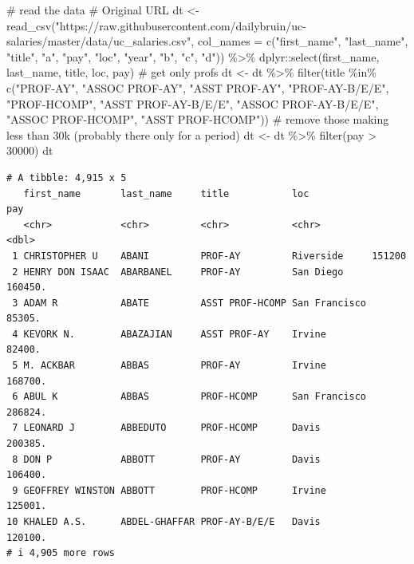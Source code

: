 \documentclass[
  letterpaper,
  DIV=11,
  numbers=noendperiod]{scrreprt}
\newenvironment{Shaded}{\begin{snugshade}}{\end{snugshade}}
\newcommand{\AttributeTok}[1]{\textcolor[rgb]{0.40,0.45,0.13}{#1}}
\newcommand{\CommentTok}[1]{\textcolor[rgb]{0.37,0.37,0.37}{#1}}
\newcommand{\DecValTok}[1]{\textcolor[rgb]{0.68,0.00,0.00}{#1}}
\newcommand{\FunctionTok}[1]{\textcolor[rgb]{0.28,0.35,0.67}{#1}}
\newcommand{\NormalTok}[1]{\textcolor[rgb]{0.00,0.23,0.31}{#1}}
\newcommand{\OtherTok}[1]{\textcolor[rgb]{0.00,0.23,0.31}{#1}}
\newcommand{\SpecialCharTok}[1]{\textcolor[rgb]{0.37,0.37,0.37}{#1}}
\newcommand{\StringTok}[1]{\textcolor[rgb]{0.13,0.47,0.30}{#1}}
\begin{document}
\begin{Shaded}
\begin{Highlighting}[]
\CommentTok{\# read the data}
\CommentTok{\# Original URL}
\NormalTok{dt }\OtherTok{\textless{}{-}} \FunctionTok{read\_csv}\NormalTok{(}\StringTok{"https://raw.githubusercontent.com/dailybruin/uc{-}salaries/master/data/uc\_salaries.csv"}\NormalTok{, }
               \AttributeTok{col\_names =} \FunctionTok{c}\NormalTok{(}\StringTok{"first\_name"}\NormalTok{, }\StringTok{"last\_name"}\NormalTok{, }\StringTok{"title"}\NormalTok{, }\StringTok{"a"}\NormalTok{, }\StringTok{"pay"}\NormalTok{, }\StringTok{"loc"}\NormalTok{, }\StringTok{"year"}\NormalTok{, }\StringTok{"b"}\NormalTok{, }\StringTok{"c"}\NormalTok{, }\StringTok{"d"}\NormalTok{)) }\SpecialCharTok{\%\textgreater{}\%} 
\NormalTok{      dplyr}\SpecialCharTok{::}\FunctionTok{select}\NormalTok{(first\_name, last\_name, title, loc, pay)}
\CommentTok{\# get only profs}
\NormalTok{dt }\OtherTok{\textless{}{-}}\NormalTok{ dt }\SpecialCharTok{\%\textgreater{}\%} \FunctionTok{filter}\NormalTok{(title }\SpecialCharTok{\%in\%} \FunctionTok{c}\NormalTok{(}\StringTok{"PROF{-}AY"}\NormalTok{, }\StringTok{"ASSOC PROF{-}AY"}\NormalTok{, }\StringTok{"ASST PROF{-}AY"}\NormalTok{, }
                                 \StringTok{"PROF{-}AY{-}B/E/E"}\NormalTok{, }\StringTok{"PROF{-}HCOMP"}\NormalTok{, }\StringTok{"ASST PROF{-}AY{-}B/E/E"}\NormalTok{, }
                                 \StringTok{"ASSOC PROF{-}AY{-}B/E/E"}\NormalTok{, }\StringTok{"ASSOC PROF{-}HCOMP"}\NormalTok{, }\StringTok{"ASST PROF{-}HCOMP"}\NormalTok{))}
\CommentTok{\# remove those making less than 30k (probably there only for a period)}
\NormalTok{dt }\OtherTok{\textless{}{-}}\NormalTok{ dt }\SpecialCharTok{\%\textgreater{}\%} \FunctionTok{filter}\NormalTok{(pay }\SpecialCharTok{\textgreater{}} \DecValTok{30000}\NormalTok{)}
\NormalTok{dt}
\end{Highlighting}
\end{Shaded}

\begin{verbatim}
# A tibble: 4,915 x 5
   first_name       last_name     title           loc               pay
   <chr>            <chr>         <chr>           <chr>           <dbl>
 1 CHRISTOPHER U    ABANI         PROF-AY         Riverside     151200 
 2 HENRY DON ISAAC  ABARBANEL     PROF-AY         San Diego     160450.
 3 ADAM R           ABATE         ASST PROF-HCOMP San Francisco  85305.
 4 KEVORK N.        ABAZAJIAN     ASST PROF-AY    Irvine         82400.
 5 M. ACKBAR        ABBAS         PROF-AY         Irvine        168700.
 6 ABUL K           ABBAS         PROF-HCOMP      San Francisco 286824.
 7 LEONARD J        ABBEDUTO      PROF-HCOMP      Davis         200385.
 8 DON P            ABBOTT        PROF-AY         Davis         106400.
 9 GEOFFREY WINSTON ABBOTT        PROF-HCOMP      Irvine        125001.
10 KHALED A.S.      ABDEL-GHAFFAR PROF-AY-B/E/E   Davis         120100.
# i 4,905 more rows
\end{verbatim}
\end{document}
